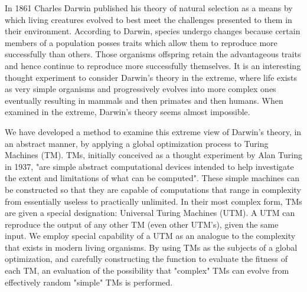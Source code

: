 In 1861 Charles Darwin published his theory of natural selection as a means by which living creatures evolved to best meet the challenges presented to them in their environment. \cite{Origin_of_species} According to Darwin, species undergo changes because certain members of a population posses traits which allow them to reproduce more successfully than others. Those organisms offspring retain the advantageous traits and hence continue to reproduce more successfully themselves. It is an interesting thought experiment to consider Darwin's theory in the extreme, where life exists as very simple organisms and progressively evolves into more complex ones eventually resulting in mammals and then primates and then humans. When examined in the extreme, Darwin's theory seems almost impossible. 

We have developed a method to examine this extreme view of Darwin's theory, in an abstract manner, by applying a global optimization process to Turing Machines (TM). TMs, initially conceived as a thought experiment by Alan Turing in 1937, "are simple abstract computational devices intended to help investigate the extent and limitations of what can be computed". \cite{SEP_turing} These simple machines can be constructed so that they are capable of computations that range in complexity from essentially useless to practically unlimited. In their most complex form, TMs are given a special designation: Universal Turing Machines (UTM). A UTM can reproduce the output of any other TM (even other UTM's), given the same input. We employ special capability of a UTM as an analogue to the complexity that exists in modern living organisms. By using TMs as the subjects of a global optimization, and carefully constructing the function to evaluate the fitness of each TM, an evaluation of the possibility that "complex" TMs can evolve from effectively random "simple" TMs is performed. 

